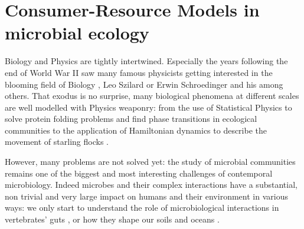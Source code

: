 \documentclass[12pt, titlepage]{report}
\begin{document}
\section[CRMs in microbial ecology]{Consumer-Resource
 Models in microbial ecology}

Biology and Physics are tightly intertwined. Especially the years following the end of World War II saw many famous physicists getting interested in the blooming field of Biology \cite{jogalekar_physicists_nodate}, Leo Szilard or Erwin Schroedinger and his  \cite{schrodinger_what_1944} among others. That exodus is no surprise, many biological phenomena at different scales are well modelled with Physics weaponry: from the use of Statistical Physics to solve protein folding problems \cite{chan_protein_1993} and find phase transitions in ecological communities \cite{fisher_transition_2014} to the application of Hamiltonian dynamics to describe the movement of starling flocks \cite{attanasi_information_2014}.


However, many problems are not solved yet: the study of microbial communities remains one of the biggest and most interesting challenges of contemporal microbiology. Indeed microbes and their complex interactions have a substantial, non trivial and very large impact on humans and their environment in various ways: we only start to understand the role of microbiological interactions in vertebrates' guts \cite{ley_worlds_2008}, or how they shape our soils \cite{becerra-castro_wastewater_2015} and oceans \cite{falkowski_biogeochemical_1998}.
\end{document}
